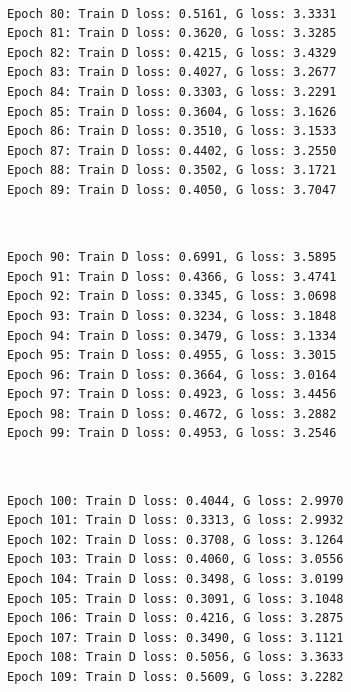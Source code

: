 \documentclass[11pt]{article}
\begin{document}
    \begin{center}
    \end{center}
    { \hspace*{\fill} \\}
    
    \begin{Verbatim}[commandchars=\\\{\}]
Epoch 80: Train D loss: 0.5161, G loss: 3.3331
Epoch 81: Train D loss: 0.3620, G loss: 3.3285
Epoch 82: Train D loss: 0.4215, G loss: 3.4329
Epoch 83: Train D loss: 0.4027, G loss: 3.2677
Epoch 84: Train D loss: 0.3303, G loss: 3.2291
Epoch 85: Train D loss: 0.3604, G loss: 3.1626
Epoch 86: Train D loss: 0.3510, G loss: 3.1533
Epoch 87: Train D loss: 0.4402, G loss: 3.2550
Epoch 88: Train D loss: 0.3502, G loss: 3.1721
Epoch 89: Train D loss: 0.4050, G loss: 3.7047

    \end{Verbatim}

    \begin{center}
    \end{center}
    { \hspace*{\fill} \\}
    
    \begin{Verbatim}[commandchars=\\\{\}]
Epoch 90: Train D loss: 0.6991, G loss: 3.5895
Epoch 91: Train D loss: 0.4366, G loss: 3.4741
Epoch 92: Train D loss: 0.3345, G loss: 3.0698
Epoch 93: Train D loss: 0.3234, G loss: 3.1848
Epoch 94: Train D loss: 0.3479, G loss: 3.1334
Epoch 95: Train D loss: 0.4955, G loss: 3.3015
Epoch 96: Train D loss: 0.3664, G loss: 3.0164
Epoch 97: Train D loss: 0.4923, G loss: 3.4456
Epoch 98: Train D loss: 0.4672, G loss: 3.2882
Epoch 99: Train D loss: 0.4953, G loss: 3.2546

    \end{Verbatim}

    \begin{center}
    \end{center}
    { \hspace*{\fill} \\}
    
    \begin{Verbatim}[commandchars=\\\{\}]
Epoch 100: Train D loss: 0.4044, G loss: 2.9970
Epoch 101: Train D loss: 0.3313, G loss: 2.9932
Epoch 102: Train D loss: 0.3708, G loss: 3.1264
Epoch 103: Train D loss: 0.4060, G loss: 3.0556
Epoch 104: Train D loss: 0.3498, G loss: 3.0199
Epoch 105: Train D loss: 0.3091, G loss: 3.1048
Epoch 106: Train D loss: 0.4216, G loss: 3.2875
Epoch 107: Train D loss: 0.3490, G loss: 3.1121
Epoch 108: Train D loss: 0.5056, G loss: 3.3633
Epoch 109: Train D loss: 0.5609, G loss: 3.2282

    \end{Verbatim}
\end{document}

